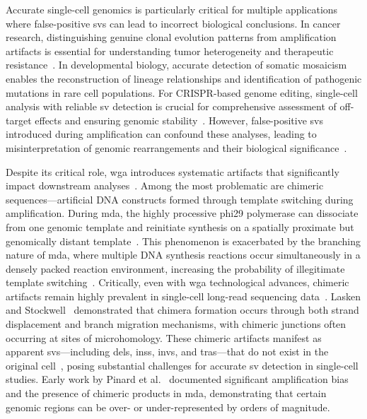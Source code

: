 \documentclass[pdflatex,sn-nature,lineno]{sn-jnl}%
\theoremstyle{thmstyleone}%
\theoremstyle{thmstyletwo}%
\theoremstyle{thmstylethree}%
\begin{document}
Accurate single-cell genomics is particularly critical for multiple applications where false-positive \glspl{sv} can lead to incorrect biological conclusions.
In cancer research, distinguishing genuine clonal evolution patterns from amplification artifacts is essential for understanding tumor heterogeneity and therapeutic resistance~\cite{navin2011tumour}.
In developmental biology, accurate detection of somatic mosaicism enables the reconstruction of lineage relationships and identification of pathogenic mutations in rare cell populations.
For CRISPR-based genome editing, single-cell analysis with reliable \gls{sv} detection is crucial for comprehensive assessment of off-target effects and ensuring genomic stability~\cite{gonzalez-pena2021accurate}.
However, false-positive \glspl{sv} introduced during amplification can confound these analyses, leading to misinterpretation of genomic rearrangements and their biological significance~\cite{macaulay2014single,lu2023chimera}.

Despite its critical role, \gls{wga} introduces systematic artifacts that significantly impact downstream analyses~\cite{lu2023chimera,lu2023exploration, pinard2006assessment,lasken2007mechanism,chen2017singlecell}.
Among the most problematic are chimeric sequences—artificial DNA constructs formed through template switching during amplification.
During \gls{mda}, the highly processive phi29 polymerase can dissociate from one genomic template and reinitiate synthesis on a spatially proximate but genomically distant template~\cite{lasken2007mechanism,lu2023chimera}.
This phenomenon is exacerbated by the branching nature of \gls{mda}, where multiple DNA synthesis reactions occur simultaneously in a densely packed reaction environment, increasing the probability of illegitimate template switching~\cite{lasken2007mechanism}.
Critically, even with \gls{wga} technological advances, chimeric artifacts remain highly prevalent in single-cell long-read sequencing data~\cite{hard2023longread,gonzalez-pena2021accurate}.
Lasken and Stockwell~\cite{lasken2007mechanism} demonstrated that chimera formation occurs through both strand displacement and branch migration mechanisms, with chimeric junctions often occurring at sites of microhomology.
These chimeric artifacts manifest as apparent \glspl{sv}—including \glspl{del}, \glspl{ins}, \glspl{inv}, and \glspl{tra}—that do not exist in the original cell~\cite{lu2023chimera,agyabeng2025evaluating}, posing substantial challenges for accurate \gls{sv} detection in single-cell studies.
Early work by Pinard et al.~\cite{pinard2006assessment} documented significant amplification bias and the presence of chimeric products in \gls{mda}, demonstrating that certain genomic regions can be over- or under-represented by orders of magnitude.
\end{document}
